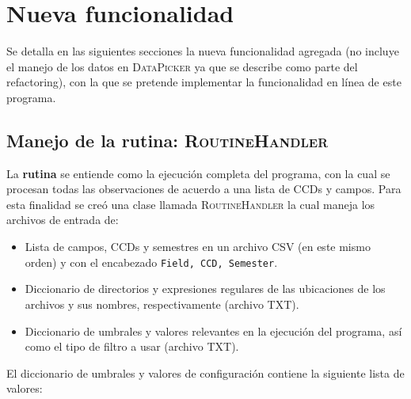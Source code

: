 \chapter{Nueva funcionalidad}
\label{ch:news}
Se detalla en las siguientes secciones la nueva funcionalidad agregada (no incluye el manejo de los datos en \textsc{DataPicker} ya que se describe como parte del refactoring), con la que se pretende implementar la funcionalidad en l\'inea de  este programa. 

\section{Manejo de la rutina: \textsc{RoutineHandler}}

La \textbf{rutina} se entiende como la ejecuci\'on completa del programa, con la cual se procesan todas las observaciones de acuerdo a una lista de CCDs y campos. Para esta finalidad se cre\'o una clase llamada \textsc{RoutineHandler} la cual maneja los archivos de entrada de:

\begin{itemize}
\item Lista de campos, CCDs y semestres en un archivo CSV (en este mismo orden) y con el encabezado \texttt{Field, CCD, Semester}.  
\item Diccionario de directorios y expresiones regulares de las ubicaciones de los archivos y sus nombres, respectivamente (archivo TXT). 
\item Diccionario de umbrales y valores relevantes en la ejecuci\'on del programa, as\'i como el tipo de filtro a usar (archivo TXT).
\end{itemize}
\bigskip

El diccionario de umbrales y valores de configuraci\'on contiene la siguiente lista de valores:

